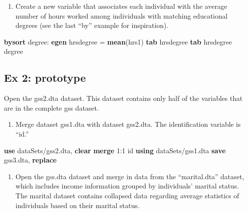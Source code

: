 \documentclass[]{book}
\newenvironment{Shaded}{\begin{snugshade}}{\end{snugshade}}
\newcommand{\KeywordTok}[1]{\textcolor[rgb]{0.13,0.29,0.53}{\textbf{#1}}}
\newcommand{\NormalTok}[1]{#1}
\providecommand{\tightlist}{%
  \setlength{\itemsep}{0pt}\setlength{\parskip}{0pt}}
\begin{document}
\begin{enumerate}
\def\labelenumi{\arabic{enumi}.}
\setcounter{enumi}{2}
\tightlist
\item
  Create a new variable that associates each individual with the average number of hours worked among individuals with matching educational degrees (see the last ``by'' example for inspiration).
\end{enumerate}

\begin{Shaded}
\begin{Highlighting}[]
  \KeywordTok{bysort}\NormalTok{ degree: }\KeywordTok{egen}\NormalTok{ hrsdegree = }\KeywordTok{mean}\NormalTok{(hrs1)}
  \KeywordTok{tab}\NormalTok{ hrsdegree}
  \KeywordTok{tab}\NormalTok{ hrsdegree degree }
\end{Highlighting}
\end{Shaded}

\hypertarget{ex-2-prototype-5}{%
\subsection{Ex 2: prototype}\label{ex-2-prototype-5}}

Open the gss2.dta dataset. This dataset contains only half of the variables that are in the complete gss dataset.

\begin{enumerate}
\def\labelenumi{\arabic{enumi}.}
\tightlist
\item
  Merge dataset gss1.dta with dataset gss2.dta. The identification variable is ``id.''
\end{enumerate}

\begin{Shaded}
\begin{Highlighting}[]
  \KeywordTok{use}\NormalTok{ dataSets/gss2.dta, }\KeywordTok{clear}
  \KeywordTok{merge}\NormalTok{ 1:1 id }\KeywordTok{using}\NormalTok{ dataSets/gss1.dta}
  \KeywordTok{save}\NormalTok{ gss3.dta, }\KeywordTok{replace}
\end{Highlighting}
\end{Shaded}

\begin{enumerate}
\def\labelenumi{\arabic{enumi}.}
\setcounter{enumi}{1}
\tightlist
\item
  Open the gss.dta dataset and merge in data from the ``marital.dta'' dataset, which includes income information grouped by individuals' marital status. The marital dataset contains collapsed data regarding average statistics of individuals based on their marital status.
\end{enumerate}
\end{document}
